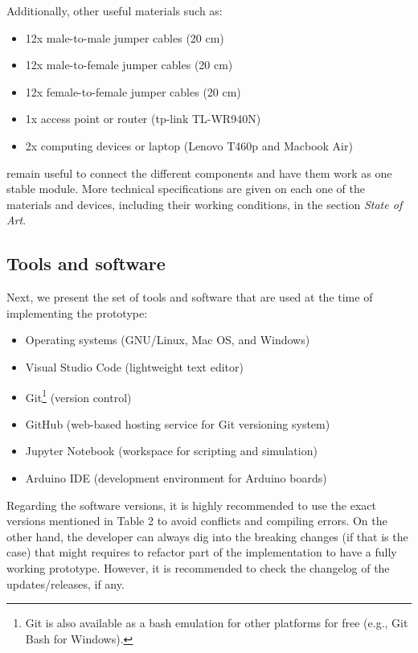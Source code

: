 Additionally, other useful materials such as:
\begin{itemize}
    \item 12x male-to-male jumper cables (20 cm)
    \item 12x male-to-female jumper cables (20 cm)
    \item 12x female-to-female jumper cables (20 cm)
    \item 1x access point or router (tp-link TL-WR940N)
    \item 2x computing devices or laptop (Lenovo T460p and Macbook Air)
\end{itemize}
remain useful to connect the different components and have them work as one stable module. More technical specifications are given on each one of the materials and devices, including their working conditions, in the section \emph{State of Art}.


\subsection{Tools and software}
Next, we present the set of tools and software that are used at the time of implementing the prototype:
\begin{itemize}
    \item Operating systems (GNU/Linux, Mac OS, and Windows)
    \item Visual Studio Code (lightweight text editor)
    \item Git\footnote{Git is also available as a bash emulation for other platforms for free (e.g., Git Bash for Windows).} (version control)
    \item GitHub (web-based hosting service for Git versioning system)
    \item Jupyter Notebook (workspace for scripting and simulation)
    \item Arduino IDE (development environment for Arduino boards)
\end{itemize}


Regarding the software versions, it is highly recommended to use the exact versions mentioned in Table 2 to avoid conflicts and compiling errors. On the other hand, the developer can always dig into the breaking changes (if that is the case) that might requires to refactor part of the implementation to have a fully working prototype. However, it is recommended to check the changelog of the updates/releases, if any.

